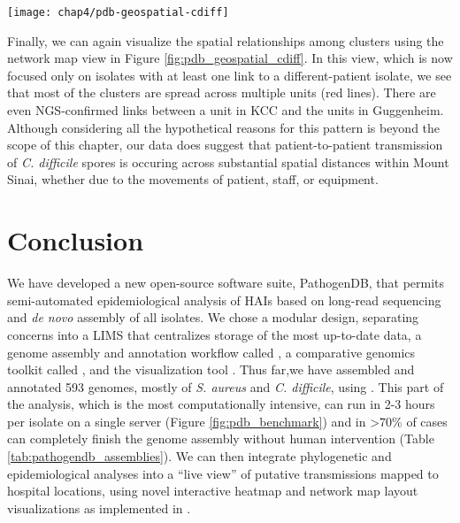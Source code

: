\begin{sidewaysfigure}[hp]
  \sidewaysvspace
  \centering
  \texttt{[image: chap4/pdb-geospatial-cdiff]}               
\end{sidewaysfigure}

Finally, we can again visualize the spatial relationships among clusters using the network map view in Figure \ref{fig:pdb_geospatial_cdiff}. In this view, which is now focused only on isolates with at least one link to a different-patient isolate, we see that most of the clusters are spread across multiple units (red lines). There are even  NGS-confirmed links between a unit in KCC and the units in Guggenheim. Although considering all the hypothetical reasons for this pattern is beyond the scope of this chapter, our data does suggest that patient-to-patient transmission of \emph{C. difficile} spores is occuring across substantial spatial distances within Mount Sinai, whether due to the movements of patient, staff, or equipment.

\section{Conclusion}

We have developed a new open-source software suite, PathogenDB, that permits semi-automated epidemiological analysis of HAIs based on long-read sequencing and \emph{de novo} assembly of all isolates. We chose a modular design, separating concerns into a LIMS that centralizes storage of the most up-to-date data, a genome assembly and annotation workflow called \pathogendbpipeline, a comparative genomics toolkit called \pathogendbcomparison, and the visualization tool \pathogendbviz. Thus far,we have assembled and annotated 593 genomes, mostly of \emph{S. aureus} and \emph{C. difficile}, using \pathogendbpipeline{}. This part of the analysis, which is the most computationally intensive, can run in 2-3 hours per isolate on a single server (Figure \ref{fig:pdb_benchmark}) and in >70\% of cases can completely finish the genome assembly without human intervention (Table \ref{tab:pathogendb_assemblies}). We can then integrate phylogenetic and epidemiological analyses into a ``live view'' of putative transmissions mapped to hospital locations, using novel interactive heatmap and network map layout visualizations as implemented in \pathogendbviz.

